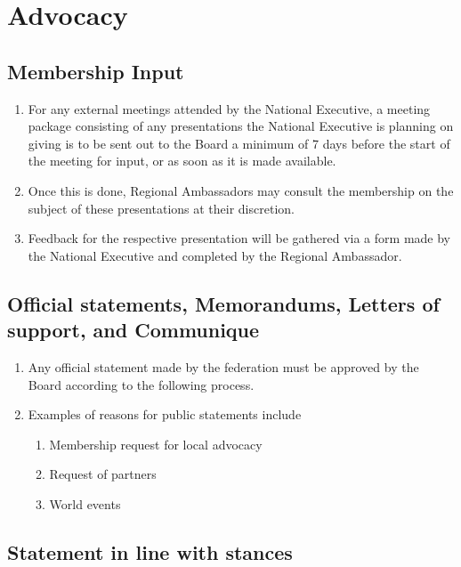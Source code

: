 \section{Advocacy}
\label{advocacy}

\subsection{Membership Input}
\label{membership-input}

\begin{enumerate}
 \item
  For any external meetings attended by the National Executive, a meeting package consisting of any presentations the National Executive is planning on giving is to be sent out to the Board a minimum of 7 days before the start of the meeting for input, or as soon as it is made available.
 \item
  Once this is done, Regional Ambassadors may consult the membership on the subject of these presentations at their discretion.
 \item
  Feedback for the respective presentation will be gathered via a form made by the National Executive and completed by the Regional Ambassador.
\end{enumerate}

\subsection{Official statements, Memorandums, Letters of support, and Communique}
\label{official-statements-memorandums-letters-of-support-and-communique}

\begin{enumerate}
 \item
  Any official statement made by the federation must be approved by the Board according to the following process.
 \item
  Examples of reasons for public statements include

  \begin{enumerate}
   \item
    Membership request for local advocacy
   \item
    Request of partners
   \item
    World events
  \end{enumerate}
\end{enumerate}

\subsection{Statement in line with stances}
\label{statement-in-line-with-stances}

